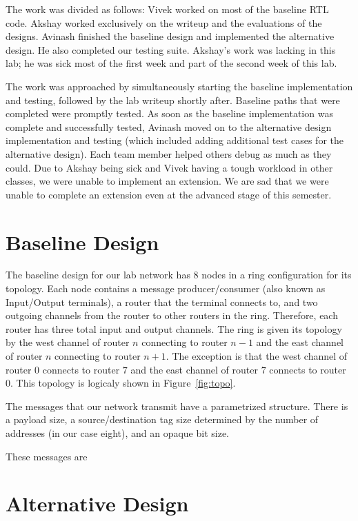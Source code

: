 \documentclass[10pt]{article}
\begin{document}
The work was divided as follows:
Vivek worked on most of the baseline RTL code.
Akshay worked exclusively on the writeup and the evaluations of the designs.
Avinash finished the baseline design and implemented the alternative design.
He also completed our testing suite.
Akshay's work was lacking in this lab; he was sick most of the first week
and part of the second week of this lab. \par

The work was approached by simultaneously starting the baseline 
implementation and testing, followed by the lab writeup shortly after.
Baseline paths that were completed were promptly tested. 
As soon as the baseline implementation was complete and successfully tested, 
Avinash moved on to the alternative design implementation and testing 
(which included adding additional test cases for the alternative design). 
Each team member helped others debug as much as they could. 
Due to Akshay being sick and Vivek having a tough workload in other classes,
we were unable to implement an extension. 
We are sad that we were unable to complete an extension even at the advanced
stage of this semester. 


\section{Baseline Design}

The baseline design for our lab network has 8 nodes in a ring configuration
for its topology. 
Each node contains a message producer/consumer (also known as Input/Output 
terminals), a router that the terminal connects to,
and two outgoing channels from the router to other routers in the ring.
Therefore, each router has three total input and output channels.
The ring is given its topology by the west channel of router $n$ connecting 
to router $n-1$ and the east channel of router $n$ connecting to router $n+1$.
The exception is that the west channel of router $0$ connects to router $7$
and the east channel of router $7$ connects to router $0$.
This topology is logicaly shown in Figure~\ref{fig:topo}. \par

The messages that our network transmit have a parametrized structure.
There is a payload size, a source/destination tag size determined by the number
of addresses (in our case eight), and an opaque bit size.

These messages are 


\section{Alternative Design}
\end{document}
